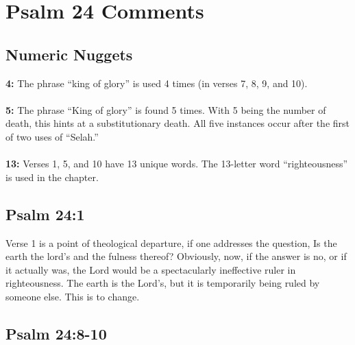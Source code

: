 \section{Psalm 24 Comments}

\subsection{Numeric Nuggets}
\textbf{4:} The phrase ``king of glory'' is used 4 times (in verses 7, 8, 9, and 10).\\
\\
\textbf{5:} The phrase ``King of glory'' is found 5 times. With 5 being the number of death, this hints at a substitutionary death. All five instances occur after the first of two uses of ``Selah.''\\
\\
\textbf{13:} Verses 1, 5, and 10 have 13 unique words. The 13-letter word ``righteousness'' is used in the chapter.


\subsection{Psalm 24:1}
Verse 1 is a point of theological departure, if one addresses the question, Is the earth the lord's and the fulness thereof?  Obviously, now, if the answer is no, or if it actually was, the Lord would be a spectacularly ineffective ruler in righteousness. The earth is the Lord's, but it is temporarily being ruled by someone else. This is to change.


\subsection{Psalm 24:8-10}


